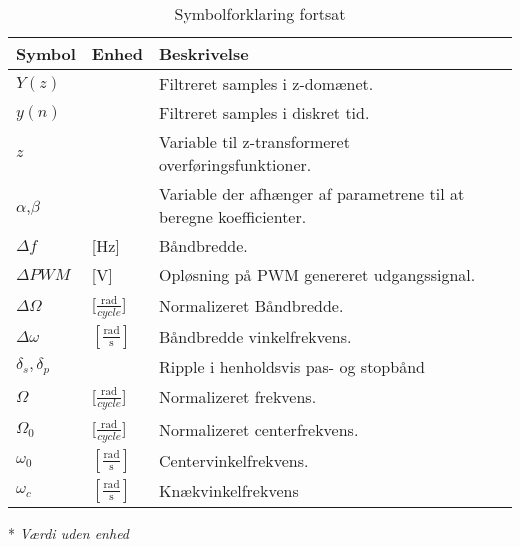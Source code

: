 \begin{table}[h!]
\centering
\caption{Symbolforklaring fortsat}
\label{tab:symboler2}
\begin{threeparttable}
\begin{tabular}{l l l}
\toprule
\multicolumn{1}{l}{Symbol}       &
\multicolumn{1}{l}{Enhed}        &
\multicolumn{1}{l}{Beskrivelse}  \\ 
\midrule
$Y(z)$\tnote{*}	    &		            & Filtreret samples i z-domænet.	\\
$y(n)$\tnote{*}	    &		            & Filtreret samples i diskret tid.	\\
$z$\tnote{*}		&					& Variable til z-transformeret overføringsfunktioner.\\
$\alpha$\tnote{*},$\beta$\tnote{*}	    &   			& Variable der afhænger af parametrene til at beregne koefficienter.\\
$\Delta f$			&	[\si{\hertz}]	& Båndbredde.	\\
$\Delta PWM$ & [\si{\volt}] & Opløsning på PWM genereret udgangssignal. \\
$\Delta \Omega$	&	[$\frac{\si{\radian}}{cycle}$]				& Normalizeret Båndbredde.	\\
$\Delta \omega$		&	$[\frac{\si{\radian}}{\si{\second}}]$	& Båndbredde vinkelfrekvens.	\\
$\delta_s, \delta_p$\tnote{*}	&   				& Ripple i henholdsvis pas- og stopbånd\\
$\Omega$	&	[$\frac{\si{\radian}}{cycle}$]				& Normalizeret frekvens.	\\
$\Omega_0$	&	[$\frac{\si{\radian}}{cycle}$]				& Normalizeret centerfrekvens.	\\
$\omega_0$			&	$[\frac{\si{\radian}}{\si{\second}}]$	& Centervinkelfrekvens.	\\
$\omega _c$ & $[\frac{\si{\radian}}{\si{\second}}]$ & Knækvinkelfrekvens \\
\bottomrule
\end{tabular}
\begin{tablenotes}
\item[*] \textit{Værdi uden enhed}
\end{tablenotes}
\end{threeparttable}
\end{table}


